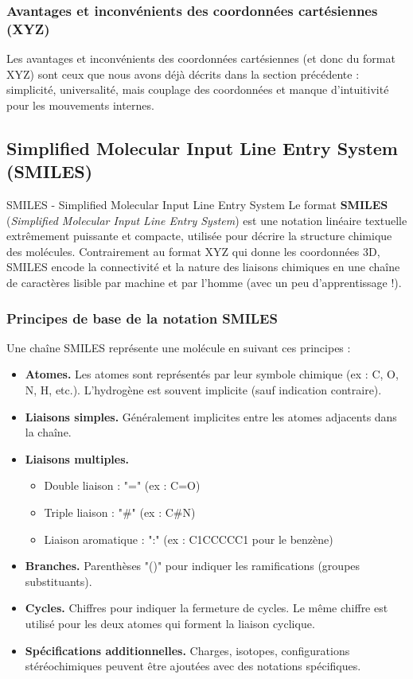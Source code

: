 \documentclass[12pt,a4paper]{article} %
\numberwithin{equation}{section} %
\numberwithin{figure}{section} %
\numberwithin{table}{section} %
\begin{document}
\subsubsection{Avantages et inconvénients des coordonnées cartésiennes (XYZ)}

Les avantages et inconvénients des coordonnées cartésiennes (et donc du format XYZ) sont ceux que nous avons déjà décrits dans la section précédente : simplicité, universalité, mais couplage des coordonnées et manque d'intuitivité pour les mouvements internes.

\subsection{Simplified Molecular Input Line Entry System (SMILES)}

\begin{definition}{SMILES - Simplified Molecular Input Line Entry System}{}
Le format \textbf{SMILES} (\textit{Simplified Molecular Input Line Entry System}) est une notation linéaire textuelle extrêmement puissante et compacte, utilisée pour décrire la structure chimique des molécules. Contrairement au format XYZ qui donne les coordonnées 3D, SMILES encode la connectivité et la nature des liaisons chimiques en une chaîne de caractères lisible par machine et par l'homme (avec un peu d'apprentissage !).
\end{definition}

\subsubsection{Principes de base de la notation SMILES}

Une chaîne SMILES représente une molécule en suivant ces principes :
\begin{itemize}
 \item \textbf{Atomes.} Les atomes sont représentés par leur symbole chimique (ex : C, O, N, H, etc.). L'hydrogène est souvent implicite (sauf indication contraire).
 \item \textbf{Liaisons simples.} Généralement implicites entre les atomes adjacents dans la chaîne.
 \item \textbf{Liaisons multiples.}
 \begin{itemize}
  \item Double liaison : "=" (ex : C=O)
  \item Triple liaison : "\#" (ex : C\#N)
  \item Liaison aromatique : ":" (ex : C1CCCCC1 pour le benzène)
 \end{itemize}
 \item \textbf{Branches.} Parenthèses "()" pour indiquer les ramifications (groupes substituants).
 \item \textbf{Cycles.} Chiffres pour indiquer la fermeture de cycles. Le même chiffre est utilisé pour les deux atomes qui forment la liaison cyclique.
 \item \textbf{Spécifications additionnelles.} Charges, isotopes, configurations stéréochimiques peuvent être ajoutées avec des notations spécifiques.
\end{itemize}
\end{document}
